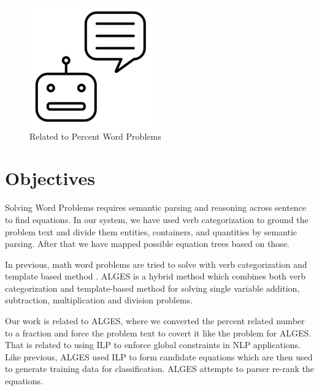 \documentclass[document.tex]{subfiles}
\begin{document}
\begin{figure}[H]
\begin{multicols}{4}[\columnsep=2.0cm]
		\includegraphics[scale=0.35]{imgs/chatbot.png}
		
	\end{multicols}
	\caption {Related to Percent Word Problems\cite{googleimage}}
	\label{fig:relatedFig}
\end{figure}

\section{Objectives}

Solving Word Problems requires semantic parsing and
reasoning across sentence to find equations. In our system, we
have used verb categorization to ground the problem text and
divide them entities, containers, and quantities by semantic
parsing. After that we have mapped possible equation trees
based on those.

In previous, math word problems are tried to
solve with verb categorization \cite{1} and template based method \cite{2}. ALGES \cite{3} is a hybrid method which combines both verb categorization and template-based method for solving single variable addition, subtraction, multiplication and division
problems.

Our work is related to ALGES, where we converted the percent related number to a fraction and force the problem text to covert it like the problem for ALGES. That is related to using ILP to enforce global constraints in NLP applications\cite{24}. Like previous\cite{25, 26, 27, 28}, ALGES used ILP to form candidate equations which are then used to generate training data for classification. ALGES attempts to parser re-rank the equations\cite{29, 30}.

%
%
\end{document}
